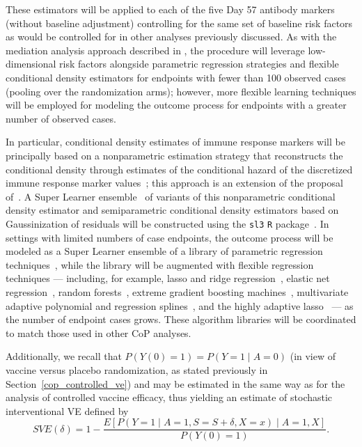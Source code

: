 These estimators will be applied to each of the five Day 57 antibody markers
(without baseline adjustment) controlling for the same set of baseline risk
factors as would be controlled for in other analyses previously discussed. As
with the mediation analysis approach described in
\citet{benkeser2021inference,gilbert2021covpn}, the procedure will leverage
low-dimensional risk factors alongside parametric regression strategies and
flexible conditional density estimators for endpoints with fewer than 100
observed cases (pooling over the randomization arms); however, more flexible
learning techniques will be employed for modeling the outcome process for
endpoints with a greater number of observed cases.

In particular, conditional density estimates of immune response markers will be
principally based on a nonparametric estimation strategy that reconstructs the
conditional density through estimates of the conditional hazard of the
discretized immune response marker values~\citep{hejazi2020efficient,
hejazi2020efficient, hejazi2020haldensify}; this approach is an extension
of the proposal of~\citet{diaz2011super}. A Super Learner
ensemble~\citep{vdl2007super} of variants of this nonparametric
conditional density estimator and semiparametric conditional density estimators
based on Gaussinization of residuals will be constructed using the \texttt{sl3}
\texttt{R} package~\citep{coyle2020sl3}. In settings with limited numbers of
case endpoints, the outcome process will be modeled as a Super Learner ensemble
of a library of parametric regression techniques~\citep[as recommend
by][]{gruber2010application}, while the library will be augmented with flexible
regression techniques --- including, for example, lasso and ridge
regression~\citep{tibshirani1996regression,tikhonov1977solutions,hoerl1970ridge},
elastic net regression~\citep{zou2003regression,friedman2009glmnet}, random
forests~\citep{breiman2001random, wright2017ranger}, extreme gradient boosting
machines~\citep{chen2016xgboost}, multivariate adaptive polynomial and regression
splines~\citep{friedman1991multivariate, stone1994use,
kooperberg1997polychotomous}, and the highly adaptive
lasso~\citep{vdl2017generally,benkeser2016highly,hejazi2020hal9001-joss} --- as
the number of endpoint cases grows. These algorithm libraries will be
coordinated to match those used in other CoP analyses.

Additionally, we recall that $P(Y(0)=1) = P(Y=1 \mid A=0)$ (in view of vaccine
versus placebo randomization, as stated previously in
Section~\ref{cop_controlled_ve}) and may be estimated in the same way as for the
analysis of controlled vaccine efficacy, thus yielding an estimate of
stochastic interventional VE defined by $$ SVE(\delta) = 1 - \frac{E[P(Y
= 1 \mid A = 1, S = S + \delta, X = x) \mid A = 1, X]}{P(Y(0)=1)}.$$

